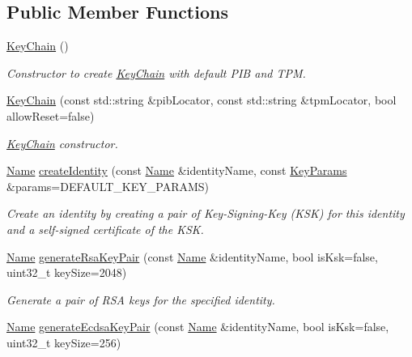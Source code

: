 \subsection*{Public Member Functions}
\begin{DoxyCompactItemize}
\item 
\hyperlink{classndn_1_1security_1_1KeyChain_adf8092a8d517e39d9fe2c18fc0fe1f96}{Key\+Chain} ()
\begin{DoxyCompactList}\small\item\em Constructor to create \hyperlink{classndn_1_1security_1_1KeyChain}{Key\+Chain} with default P\+IB and T\+PM. \end{DoxyCompactList}\item 
\hyperlink{classndn_1_1security_1_1KeyChain_a32bd1457d4d52ec769d5115a8903a911}{Key\+Chain} (const std\+::string \&pib\+Locator, const std\+::string \&tpm\+Locator, bool allow\+Reset=false)
\begin{DoxyCompactList}\small\item\em \hyperlink{classndn_1_1security_1_1KeyChain}{Key\+Chain} constructor. \end{DoxyCompactList}\item 
\hyperlink{classndn_1_1Name}{Name} \hyperlink{classndn_1_1security_1_1KeyChain_a9c50aa4c839df85f22c285c6f1e5c15e}{create\+Identity} (const \hyperlink{classndn_1_1Name}{Name} \&identity\+Name, const \hyperlink{classndn_1_1KeyParams}{Key\+Params} \&params=D\+E\+F\+A\+U\+L\+T\+\_\+\+K\+E\+Y\+\_\+\+P\+A\+R\+A\+MS)
\begin{DoxyCompactList}\small\item\em Create an identity by creating a pair of Key-\/\+Signing-\/\+Key (K\+SK) for this identity and a self-\/signed certificate of the K\+SK. \end{DoxyCompactList}\item 
\hyperlink{classndn_1_1Name}{Name} \hyperlink{classndn_1_1security_1_1KeyChain_a1b66b39bc8045408dcb4990b1c90f06b}{generate\+Rsa\+Key\+Pair} (const \hyperlink{classndn_1_1Name}{Name} \&identity\+Name, bool is\+Ksk=false, uint32\+\_\+t key\+Size=2048)
\begin{DoxyCompactList}\small\item\em Generate a pair of R\+SA keys for the specified identity. \end{DoxyCompactList}\item 
\hyperlink{classndn_1_1Name}{Name} \hyperlink{classndn_1_1security_1_1KeyChain_af3ef46d4a94b2777bda04e3615907f6c}{generate\+Ecdsa\+Key\+Pair} (const \hyperlink{classndn_1_1Name}{Name} \&identity\+Name, bool is\+Ksk=false, uint32\+\_\+t key\+Size=256)

\end{DoxyCompactItemize}
